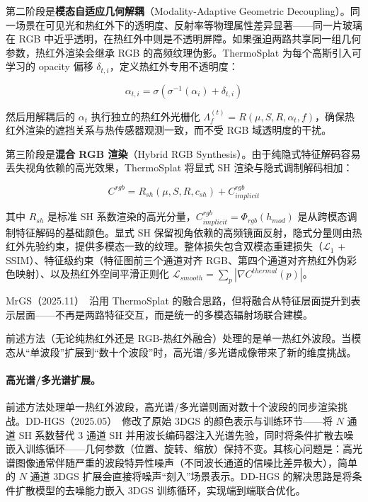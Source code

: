 第二阶段是\textbf{模态自适应几何解耦}（Modality-Adaptive Geometric Decoupling）。同一场景在可见光和热红外下的透明度、反射率等物理属性差异显著——同一片玻璃在 RGB 中近乎透明，在热红外中则是不透明屏障。如果强迫两路共享同一组几何参数，热红外渲染会继承 RGB 的高频纹理伪影。ThermoSplat 为每个高斯引入可学习的 opacity 偏移 $\delta_{t,i}$，定义热红外专用不透明度：

\begin{equation}
\alpha_{t,i} = \sigma(\sigma^{-1}(\alpha_i) + \delta_{t,i})
\end{equation}

然后用解耦后的 $\alpha_t$ 执行独立的热红外光栅化 $\Lambda_f^{(t)} = R(\mu, S, R, \alpha_t, f)$，确保热红外渲染的遮挡关系与热传感器观测一致，而不受 RGB 域透明度的干扰。

第三阶段是\textbf{混合 RGB 渲染}（Hybrid RGB Synthesis）。由于纯隐式特征解码容易丢失视角依赖的高光效果，ThermoSplat 将显式 SH 渲染与隐式调制解码相加：

\begin{equation}
C^{rgb} = R_{sh}(\mu, S, R, c_{sh}) + C^{rgb}_{implicit}
\end{equation}

其中 $R_{sh}$ 是标准 SH 系数渲染的高光分量，$C^{rgb}_{implicit} = \Phi_{rgb}(h_{mod})$ 是从跨模态调制特征解码的基础颜色。显式 SH 保留视角依赖的高频镜面反射，隐式分量则由热红外先验约束，提供多模态一致的纹理。整体损失包含双模态重建损失（$\mathcal{L}_1$ + SSIM）、特征级约束（特征图前三个通道对齐 RGB、第四个通道对齐热红外伪彩色映射）、以及热红外空间平滑正则化 $\mathcal{L}_{smooth} = \sum_p |\nabla C^{thermal}(p)|$。

MrGS（2025.11）~\cite{2511_22997}沿用 ThermoSplat 的融合思路，但将融合从特征层面提升到表示层面——不再是两路特征交互，而是统一的多模态辐射场联合建模。

前述方法（无论纯热红外还是 RGB-热红外融合）处理的是单一热红外波段。当模态从“单波段”扩展到“数十个波段”时，高光谱/多光谱成像带来了新的维度挑战。

\paragraph{高光谱/多光谱扩展。} 前述方法处理单一热红外波段，高光谱/多光谱则面对数十个波段的同步渲染挑战。DD-HGS（2025.05）~\cite{2505_21890}修改了原始 3DGS 的颜色表示与训练环节——将 $N$ 通道 SH 系数替代 3 通道 SH 并用波长编码器注入光谱先验，同时将条件扩散去噪嵌入训练循环——几何参数（位置、旋转、缩放）保持不变。其核心问题是：高光谱图像通常伴随严重的波段特异性噪声（不同波长通道的信噪比差异极大），简单的 $N$ 通道 3DGS 扩展会直接将噪声“刻入”场景表示。DD-HGS 的解决思路是将条件扩散模型的去噪能力嵌入 3DGS 训练循环，实现端到端联合优化。

